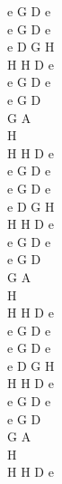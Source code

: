 \documentclass[a5paper, 10pt]{book}
\begin{document}
\begin{minipage}[t]{0.2\textwidth}
e G D e\\
e G D e\\
e D G H\\
H H D e\\
e G D e\\
e G D\\
G A\\
H\\
H H D e\\

e G D e\\
e G D e\\
e D G H\\
H H D e\\
e G D e\\
e G D\\
G A\\
H\\
H H D e\\

e G D e\\
e G D e\\
e D G H\\
H H D e\\
e G D e\\
e G D\\
G A\\
H\\
H H D e\\
\end{minipage}

\newpage
\end{document}
